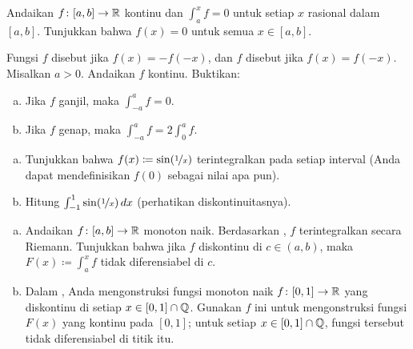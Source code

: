 \begin{exercise}
Andaikan $f \colon [a,b] \to {\mathbb{R}}$ kontinu dan
$\int_a^x f = 0$ untuk setiap $x$ rasional dalam $[a,b]$.  Tunjukkan bahwa $f(x) = 0$
untuk semua $x \in [a,b]$.
\end{exercise}

\begin{samepage}
\begin{exercise}
Fungsi $f$ disebut \emph{} jika $f(x) = -f(-x)$,
dan $f$ disebut \emph{} jika $f(x) = f(-x)$.  Misalkan $a >
0$.  Andaikan $f$ kontinu.  Buktikan:
\begin{enumerate}[a)]
\item
Jika $f$ ganjil, maka $\int_{-a}^a f = 0$.
\item
Jika $f$ genap, maka $\int_{-a}^a f = 2 \int_0^a f$.
\end{enumerate}
\end{exercise}
\end{samepage}

\begin{exercise}
\leavevmode
\begin{enumerate}[a)]
\item
Tunjukkan bahwa $f(x) \coloneqq \sin(\nicefrac{1}{x})$
terintegralkan pada setiap interval (Anda dapat mendefinisikan $f(0)$ sebagai nilai apa pun).
\item
Hitung $\int_{-1}^1 \sin(\nicefrac{1}{x})\,dx$ (perhatikan
diskontinuitasnya).
\end{enumerate}
\end{exercise}

\begin{exercise}
\leavevmode
\begin{enumerate}[a)]
\item
Andaikan $f \colon [a,b] \to {\mathbb{R}}$ monoton naik.
Berdasarkan ,
$f$ terintegralkan secara Riemann.  Tunjukkan bahwa jika $f$ diskontinu di $c \in
(a,b)$, maka $F(x) \coloneqq \int_a^x f$ tidak diferensiabel di $c$.
\item
Dalam , Anda mengonstruksi fungsi monoton naik
$f \colon [0,1] \to {\mathbb{R}}$ yang diskontinu di setiap
$x \in [0,1] \cap {\mathbb{Q}}$.  Gunakan $f$ ini untuk mengonstruksi fungsi $F(x)$ yang
kontinu pada $[0,1]$; untuk setiap $x \in [0,1] \cap {\mathbb{Q}}$, fungsi tersebut tidak diferensiabel di titik itu.
\end{enumerate}
\end{exercise}

